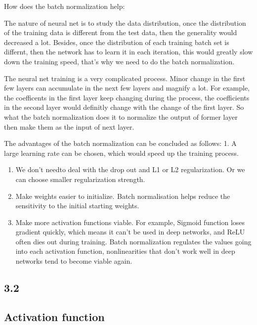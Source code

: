\documentclass[11pt]{article}
\begin{document}
How does the batch normalization help:

The nature of neural net is to study the data distribution, once the
distribution of the training data is different from the test data, then
the generality would decreased a lot. Besides, once the distribution of
each training batch set is differnt, then the network has to learn it in
each iteration, this would greatly slow down the training speed, that's
why we need to do the batch normalization.

The neural net training is a very complicated process. Minor change in
the first few layers can accumulate in the next few layers and magnify a
lot. For example, the coefficents in the first layer keep changing
during the process, the coefficients in the second layer would definitly
change with the change of the first layer. So what the batch
normalization does it to normalize the output of former layer then make
them as the input of next layer.

The advantages of the batch normalization can be concluded as follows:
1. A large learning rate can be chosen, which would speed up the
training process.

\begin{enumerate}
\def\labelenumi{\arabic{enumi}.}
\setcounter{enumi}{1}
\item
  We don't needto deal with the drop out and L1 or L2 regularization. Or
  we can choose smaller regularization strength.
\item
  Make weights easier to initialize.  Batch normalisation helps reduce
  the sensitivity to the initial starting weights.
\item
  Make more activation functions viable. For example, Sigmoid function
  loses gradient quickly, which means it can't be used in deep networks,
  and ReLU often dies out during training. Batch normalization regulates
  the values going into each activation function, nonlinearities that
  don't work well in deep networks tend to become viable again.
\end{enumerate}

    \hypertarget{section}{%
\subsection{3.2}\label{section}}

    \hypertarget{activation-function}{%
\subsection{Activation function}\label{activation-function}}
\end{document}
